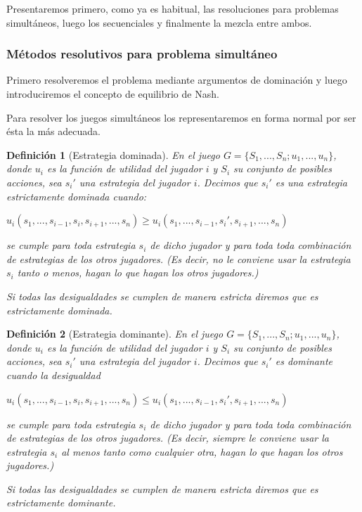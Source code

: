 \documentclass[a4paper]{report} %
\newtheorem{definicion}{Definición}[section]
\begin{document}
Presentaremos primero, como ya es habitual, las resoluciones para problemas simultáneos, luego los secuenciales y finalmente la mezcla entre ambos.

\subsubsection{Métodos resolutivos para problema simultáneo}

Primero resolveremos el problema mediante argumentos de dominación y luego introduciremos el concepto de equilibrio de Nash.

Para resolver los juegos simultáneos los representaremos en forma normal por ser ésta la más adecuada.
\begin{definicion}[Estrategia dominada]
En el juego  $G=\lbrace S_1, ..., S_n; u_1, ..., u_n\rbrace$, donde $u_i$ es la función de utilidad del jugador $i$ y $S_i$ su conjunto de posibles acciones, sea $s_i'$ una estrategia del jugador $i$.
 Decimos que $s_i'$ es una estrategia estrictamente dominada cuando:



 $
 u_i(s_1, ..., s_{i-1},s_{i},s_{i+1},...,s_n) \geq u_i(s_1,..., s_{i-1},s_{i}',s_{i+1},...,s_n)
 $



se cumple para toda estrategia $s_i$ de dicho jugador y para toda toda combinación de
estrategias  de los otros jugadores.
(Es decir, no le conviene usar la estrategia $s_i$ tanto o menos, hagan lo que hagan los otros jugadores.)

 Si todas las desigualdades se cumplen de manera estricta diremos que es estrictamente dominada.

\end{definicion}

\begin{definicion}[Estrategia dominante]
En el juego $G=\lbrace S_1, ..., S_n; u_1, ..., u_n\rbrace$, donde $u_i$ es la función de utilidad del jugador $i$ y $S_i$ su conjunto de posibles acciones, sea $s_i'$ una estrategia del jugador $i$.
 Decimos que $s_i'$ es dominante cuando la desigualdad 



 $
 u_i(s_1, ..., s_{i-1},s_{i},s_{i+1},...,s_n) \leq u_i(s_1,..., s_{i-1},s_{i}',s_{i+1},...,s_n)
 $



se cumple para toda estrategia $s_i$ de dicho jugador y para toda toda combinación de
estrategias  de los otros jugadores.
(Es decir, siempre le conviene usar la estrategia $s_i$ al menos tanto como cualquier otra, hagan lo que hagan los otros jugadores.)

 Si todas las desigualdades se cumplen de manera estricta diremos que es estrictamente dominante.

\end{definicion}
\end{document}
